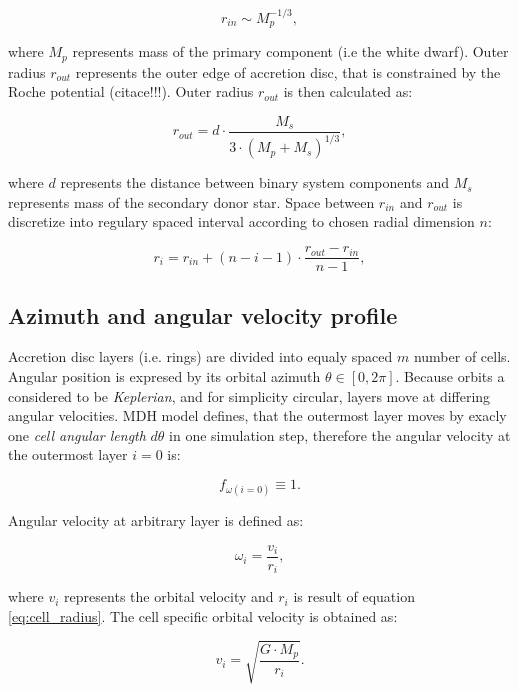 \begin{equation}
    r_{in} \sim M_p^{-1/3},
\end{equation}

where $M_p$ represents mass of the primary component (i.e the white dwarf). Outer radius $r_{out}$ represents the outer edge of accretion disc, that is constrained by the Roche potential (citace!!!). Outer radius $r_{out}$ is then calculated as:

\begin{equation}
    r_{out} = d \cdot \frac{M_{s}}{3 \cdot (M_p+M_{s})^{1/3}},
\end{equation}

where $d$ represents the distance between binary system components and $M_s$ represents mass of the secondary donor star. Space between $r_{in}$ and $r_{out}$ is discretize into regulary spaced interval according to chosen radial dimension $n$:

\begin{equation} \label{eq:cell_radius}
    r_i = r_{in} + (n - i - 1) \cdot \frac{r_{out} - r_{in}}{n - 1},
\end{equation}

\subsection{Azimuth and angular velocity profile}
Accretion disc layers (i.e. rings) are divided into equaly spaced $m$ number of cells. Angular position is expresed by its orbital azimuth $\theta \in [0, 2\pi]$. Because orbits a considered to be \emph{Keplerian}, and for simplicity circular, layers move at differing angular velocities. MDH model defines, that the outermost layer moves by exacly one \emph{cell angular length} $d\theta$ in one simulation step, therefore the angular velocity at the outermost layer $i=0$ is:

\begin{equation}
f_{\omega(i=0)} \equiv 1.
\end{equation}

Angular velocity at arbitrary layer is defined as:

\begin{equation}
\omega_i = \frac{v_i}{r_i},
\end{equation}

where $v_i$ represents the orbital velocity and $r_i$ is result of equation \ref{eq:cell_radius}. The cell specific orbital velocity is obtained as:

\begin{equation}
v_i = \sqrt{\frac{G \cdot M_p}{r_i}}.
\end{equation}

